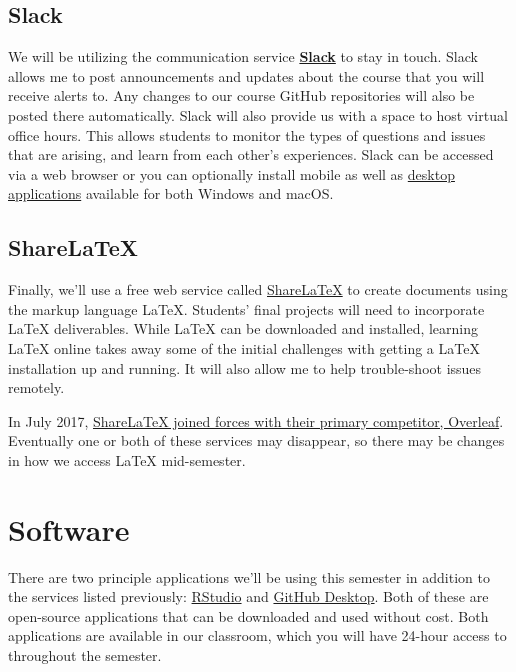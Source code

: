 \documentclass[]{book}
\theoremstyle{definition}
\theoremstyle{definition}
\theoremstyle{definition}
\theoremstyle{remark}
\begin{document}
\subsection{Slack}\label{slack}

We will be utilizing the communication service
\textbf{\href{https://slack.com}{Slack}} to stay in touch. Slack allows
me to post announcements and updates about the course that you will
receive alerts to. Any changes to our course GitHub repositories will
also be posted there automatically. Slack will also provide us with a
space to host virtual office hours. This allows students to monitor the
types of questions and issues that are arising, and learn from each
other's experiences. Slack can be accessed via a web browser or you can
optionally install mobile as well as
\href{https://slack.com/downloads/osx}{desktop applications} available
for both Windows and macOS.

\subsection{ShareLaTeX}\label{sharelatex}

Finally, we'll use a free web service called
\href{https://www.sharelatex.com}{ShareLaTeX} to create documents using
the markup language LaTeX. Students' final projects will need to
incorporate LaTeX deliverables. While LaTeX can be downloaded and
installed, learning LaTeX online takes away some of the initial
challenges with getting a LaTeX installation up and running. It will
also allow me to help trouble-shoot issues remotely.

In July 2017,
\href{https://www.sharelatex.com/blog/2017/07/20/sharelatex-joins-overleaf.html}{ShareLaTeX
joined forces with their primary competitor, Overleaf}. Eventually one
or both of these services may disappear, so there may be changes in how
we access LaTeX mid-semester.

\section{Software}\label{software}

There are two principle applications we'll be using this semester in
addition to the services listed previously:
\href{https://www.rstudio.com}{RStudio} and
\href{https://desktop.github.com}{GitHub Desktop}. Both of these are
open-source applications that can be downloaded and used without cost.
Both applications are available in our classroom, which you will have
24-hour access to throughout the semester.
\end{document}
